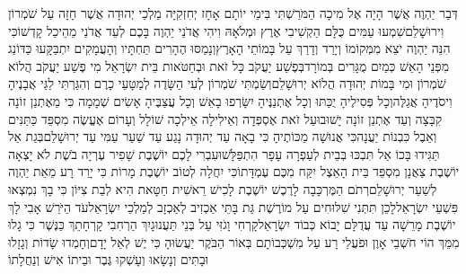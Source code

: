 \documentclass[../main/main.tex]{subfiles}
\begin{document}
\pagebreak
{}
\RTLmulticolcolumns
\begin{multicols*}{\ncols}
דְּבַר יַהְוֶה אֲשֶׁר הָיָה אֶל מִיכָה הַמֹּרַשְׁתִּי בִּימֵי יוֹתָם אָחָז יְחִזְקִיָּה מַלְכֵי יְהוּדָה אֲשֶׁר חָזָה עַל שֹׁמְרוֹן וִירוּשָׁלֵם\PreVerseSpace{}שִׁמְעוּ עַמִּים כֻּלָּם הַקְשִׁיבִי אֶרֶץ וּמְלֹאָהּ וִיהִי אֲדֹנַי יַהְוֶה בָּכֶם לְעֵד אֲדֹנַי מֵהֵיכַל קָדְשׁוֹ\PreVerseSpace{}כִּי הִנֵּה יַהְוֶה יֹצֵא מִמְּקוֹמוֹ וְיָרַד וְדָרַךְ עַל בָּמוֹתֵי הָאָרֶץ\SubEnd{}\PreVerseSpace{}וְנָמַסּוּ הֶהָרִים תַּחְתָּיו וְהָעֲמָקִים יִתְבַּקָּעוּ כַּדּוֹנַג מִפְּנֵי הָאֵשׁ כְּמַיִם מֻגָּרִים בְּמוֹרָד\PreVerseSpace{}בְּפֶשַׁע יַעֲקֹב כָּל זֹאת וּבְחַטֹּאות בֵּית יִשְׂרָאֵל מִי פֶשַׁע יַעֲקֹב הֲלוֹא שֹׁמְרוֹן וּמִי בָּמוֹת יְהוּדָה הֲלוֹא יְרוּשָׁלֵם\PreVerseSpace{}וְשַׂמְתִּי שֹׁמְרוֹן לְעִי הַשָּׂדֶה לְמַטָּעֵי כָרֶם וְהִגַּרְתִּי לַגַּי אֲבָנֶיהָ וִיסֹדֶיהָ אֲגַלֶּה\PreVerseSpace{}וְכָל פְּסִילֶיהָ יֻכַּתּוּ וְכָל אֶתְנַנֶּיהָ יִשָּׂרְפוּ בָאֵשׁ וְכָל עֲצַבֶּיהָ אָשִׂים שְׁמָמָה כִּי מֵאֶתְנַן זוֹנָה קִבָּצָה וְעַד אֶתְנַן זוֹנָה יָשׁוּבוּ\PreVerseSpace{}עַל זֹאת אֶסְפְּדָה וְאֵילִילָה אֵילְכָה שׁוֹלָל\SubEnd{} וְעָרוֹם אֶעֱשֶׂה מִסְפֵּד כַּתַּנִּים וְאֵבֶל כִּבְנוֹת יַעֲנָה\PreVerseSpace{}כִּי אֲנוּשָׁה מַכּוֹתֶיהָ כִּי בָאָה עַד יְהוּדָה נָגַע עַד שַׁעַר עַמִּי עַד יְרוּשָׁלֵם\PreVerseSpace{}בְּגַת אַל תַּגִּידוּ בָּכוֹ אַל תִּבְכּוּ בְּבֵית לְעַפְרָה עָפָר הִתְפַּלָּשׁוּ\SubEnd{}\PreVerseSpace{}עִבְרִי לָכֶם יוֹשֶׁבֶת שָׁפִיר עֶרְיָה בֹשֶׁת לֹא יָצְאָה יוֹשֶׁבֶת צַאֲנָן מִסְפֵּד\SubEnd{} בֵּית הָאֵצֶל יִקַּח מִכֶּם עֶמְדָּתוֹ\PreVerseSpace{}כִּי יִחֲלָה\SubEnd{} לְטוֹב יוֹשֶׁבֶת מָרוֹת כִּי יָרַד רָע מֵאֵת יַהְוֶה לְשַׁעַר יְרוּשָׁלֵם\PreVerseSpace{}רְתֹם הַמֶּרְכָּבָה לָרֶכֶשׁ יוֹשֶׁבֶת לָכִישׁ רֵאשִׁית חַטָּאת הִיא לְבַת צִיּוֹן כִּי בָךְ נִמְצְאוּ פִּשְׁעֵי יִשְׂרָאֵל\PreVerseSpace{}לָכֵן תִּתְּנִי שִׁלּוּחִים עַל מוֹרֶשֶׁת גַּת בָּתֵּי אַכְזִיב לְאַכְזָב לְמַלְכֵי יִשְׂרָאֵל\PreVerseSpace{}עֹד הַיֹּרֵשׁ אָבִי לָךְ יוֹשֶׁבֶת מָרֵשָׁה עַד עֲדֻלָּם יָבוֹא כְּבוֹד יִשְׂרָאֵל\PreVerseSpace{}קָרְחִי וָגֹזִּי עַל בְּנֵי תַּעֲנוּגָיִךְ הַרְחִבִי קָרְחָתֵךְ כַּנֶּשֶׁר כִּי גָלוּ מִמֵּךְ \ClosedSection{}הוֹי חֹשְׁבֵי אָוֶן וּפֹעֲלֵי רָע עַל מִשְׁכְּבוֹתָם בְּאוֹר הַבֹּקֶר יַעֲשׂוּהָ כִּי יֶשׁ לְאֵל יָדָם\PreVerseSpace{}וְחָמְדוּ שָׂדוֹת וְגָזָלוּ וּבָתִּים וְנָשָׂאוּ וְעָשְׁקוּ גֶּבֶר וּבֵיתוֹ אִישׁ\SubEnd{} וְנַחֲלָתוֹ\OpenSection{}\par

\end{multicols*}
\end{document}
